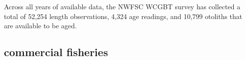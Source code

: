 \documentclass[11pt,
  english,
  letterpaper,
]{article}
\begin{document}
\leavevmode\tagmcend\tagstructend\par


Across all years of available data, the NWFSC WCGBT survey has collected a total of 52,254 length observations, 4,324 age readings, and 10,799 otoliths that are available to be aged.

\leavevmode\tagmcend\tagstructend\par


\hypertarget{commercial-fisheries}{%
\subsection{commercial fisheries}\label{commercial-fisheries}}

\leavevmode\tagmcend\tagstructend


\begingroup\fontsize{10}{12}\selectfont \begingroup\fontsize{10}{12}\selectfont

\leavevmode\tagmcend\tagstructend\par
\end{document}
